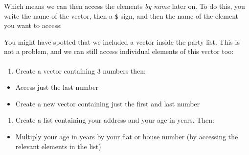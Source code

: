 \documentclass[]{article}
\newenvironment{Shaded}{\begin{snugshade}}{\end{snugshade}}
\newcommand{\DecValTok}[1]{\textcolor[rgb]{0.00,0.00,0.81}{#1}}
\newcommand{\OperatorTok}[1]{\textcolor[rgb]{0.81,0.36,0.00}{\textbf{#1}}}
\newcommand{\NormalTok}[1]{#1}
\providecommand{\tightlist}{%
  \setlength{\itemsep}{0pt}\setlength{\parskip}{0pt}}
\let\oldparagraph\paragraph
\renewcommand{\paragraph}[1]{\oldparagraph{#1}\mbox{}}
\theoremstyle{definition}
\theoremstyle{definition}
\theoremstyle{definition}
\theoremstyle{remark}
\begin{document}
Which means we can then access the elements \emph{by name} later on. To
do this, you write the name of the vector, then a \texttt{\$} sign, and
then the name of the element you want to access:

\begin{Shaded}
\end{Shaded}

You might have spotted that we included a vector inside the party list.
This is not a problem, and we can still access individual elements of
this vector too:

\begin{Shaded}
\end{Shaded}

\paragraph{}\label{section-5}

\begin{enumerate}
\def\labelenumi{\arabic{enumi}.}
\tightlist
\item
  Create a vector containing 3 numbers then:
\end{enumerate}

\begin{itemize}
\tightlist
\item
  Access just the last number
\item
  Create a new vector containing just the first and last number
\end{itemize}

\begin{enumerate}
\def\labelenumi{\arabic{enumi}.}
\setcounter{enumi}{1}
\tightlist
\item
  Create a list containing your address and your age in years. Then:
\end{enumerate}

\begin{itemize}
\tightlist
\item
  Multiply your age in years by your flat or house number (by accessing
  the relevant elements in the list)
\end{itemize}
\end{document}
